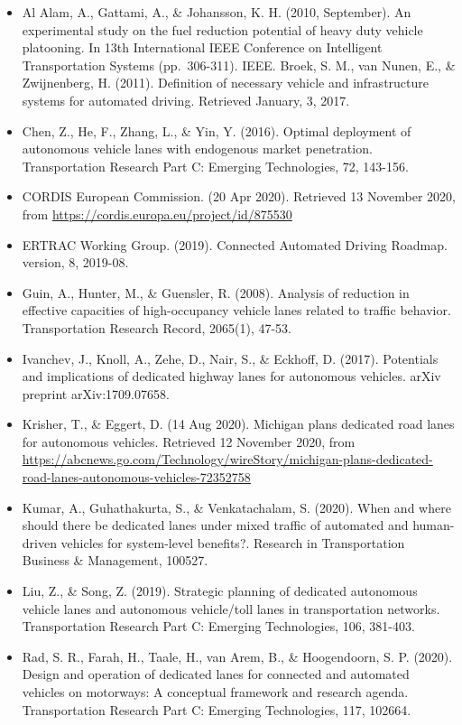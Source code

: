 \documentclass[
]{book}
\providecommand{\tightlist}{%
  \setlength{\itemsep}{0pt}\setlength{\parskip}{0pt}}
\begin{document}
\begin{itemize}
\tightlist
\item
  Al Alam, A., Gattami, A., \& Johansson, K. H. (2010, September). An experimental study on the fuel reduction potential of heavy duty vehicle platooning. In 13th International IEEE Conference on Intelligent Transportation Systems (pp.~306-311). IEEE.
  Broek, S. M., van Nunen, E., \& Zwijnenberg, H. (2011). Definition of necessary vehicle and infrastructure systems for automated driving. Retrieved January, 3, 2017.
\item
  Chen, Z., He, F., Zhang, L., \& Yin, Y. (2016). Optimal deployment of autonomous vehicle lanes with endogenous market penetration. Transportation Research Part C: Emerging Technologies, 72, 143-156.
\item
  CORDIS \textbar{} European Commission. (20 Apr 2020). Retrieved 13 November 2020, from \url{https://cordis.europa.eu/project/id/875530}
\item
  ERTRAC Working Group. (2019). Connected Automated Driving Roadmap. version, 8, 2019-08.
\item
  Guin, A., Hunter, M., \& Guensler, R. (2008). Analysis of reduction in effective capacities of high-occupancy vehicle lanes related to traffic behavior. Transportation Research Record, 2065(1), 47-53.
\item
  Ivanchev, J., Knoll, A., Zehe, D., Nair, S., \& Eckhoff, D. (2017). Potentials and implications of dedicated highway lanes for autonomous vehicles. arXiv preprint arXiv:1709.07658.
\item
  Krisher, T., \& Eggert, D. (14 Aug 2020). Michigan plans dedicated road lanes for autonomous vehicles. Retrieved 12 November 2020, from \url{https://abcnews.go.com/Technology/wireStory/michigan-plans-dedicated-road-lanes-autonomous-vehicles-72352758}
\item
  Kumar, A., Guhathakurta, S., \& Venkatachalam, S. (2020). When and where should there be dedicated lanes under mixed traffic of automated and human-driven vehicles for system-level benefits?. Research in Transportation Business \& Management, 100527.
\item
  Liu, Z., \& Song, Z. (2019). Strategic planning of dedicated autonomous vehicle lanes and autonomous vehicle/toll lanes in transportation networks. Transportation Research Part C: Emerging Technologies, 106, 381-403.
\item
  Rad, S. R., Farah, H., Taale, H., van Arem, B., \& Hoogendoorn, S. P. (2020). Design and operation of dedicated lanes for connected and automated vehicles on motorways: A conceptual framework and research agenda. Transportation Research Part C: Emerging Technologies, 117, 102664.

\end{itemize}
\end{document}
